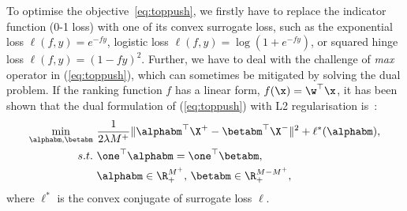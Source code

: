 To optimise the objective~\ref{eq:toppush}, 
we firstly have to replace the indicator function (0-1 loss) with one of its convex surrogate loss,
such as the exponential loss $\ell(f, y) = e^{-fy}$, logistic loss $\ell(f, y) = \log(1 + e^{-fy})$, or squared hinge loss $\ell(f, y) = (1 - fy)^2$.
Further, we have to deal with the challenge of \emph{max} operator in (\ref{eq:toppush}), which can sometimes be mitigated by solving the dual problem.
If the ranking function $f$ has a linear form, \ie $f(\x) = \w^\top \x$, it has been shown that the dual formulation of (\ref{eq:toppush}) 
with L2 regularisation is~\cite{li2014top}:
\begin{equation*}
\begin{aligned}
\min_{\alphabm, \betabm} \ & \frac{1}{2 \lambda M^+} \| \alphabm^\top \X^+ - \betabm^\top \X^- \|^2 + \ell^*(\alphabm), \\
s.t. \ & \one^\top \alphabm = \one^\top \betabm, \\
       & \alphabm \in \R_+^{M^+}, \, \betabm \in \R_+^{M-M^+},
\end{aligned}
\end{equation*}
where $\ell^*$ is the convex conjugate of surrogate loss $\ell$.


